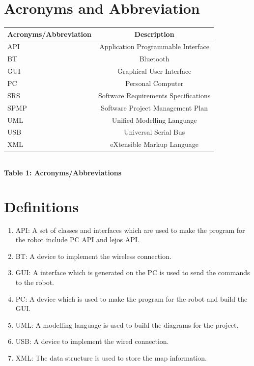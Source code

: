 \documentclass[11pt, a4paper]{report}
\begin{document}
\section{Acronyms and Abbreviation}
\begin{center}
\begin{tabular}{|l|c|}
  \hline
  \textbf{Acronyms/Abbreviation} & \textbf{Description}\\
  \hline
  API		& Application Programmable Interface \\
  \hline
  BT		& Bluetooth \\
  \hline
  GUI		& Graphical User Interface \\
  \hline
  PC		& Personal Computer\\
  \hline
  SRS	& Software Requirements Specifications \\
  \hline
  SPMP 	& Software Project Management Plan \\
  \hline
  UML	& Unified Modelling Language\\
  \hline
  USB	& Universal Serial Bus\\
  \hline
  XML 	& eXtensible Markup Language \\
  \hline
\end{tabular} \\[0.3cm]
\textbf {Table 1: Acronyms/Abbreviations} \\[0.3cm]
\end{center}
\section{Definitions}
\begin{enumerate}
\item API: A set of classes and interfaces which are used to make the program for the robot include PC API and lejos API.\\
\item BT: A device to implement the wireless connection.\\
\item GUI: A interface which is generated on the PC is used to send the commands to the robot.\\
\item PC: A device which is used to make the program for the robot and build the GUI.\\
\item UML: A modelling language is used to build the diagrams for the project.\\
\item USB: A device to implement the wired connection.\\
\item XML: The data structure is used to store the map information.\\ 
\end{enumerate}
\pagebreak
\newpage
\appendix

\pagebreak
\end{document}
